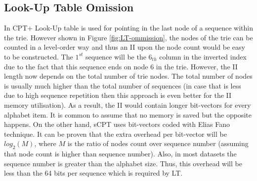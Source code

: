 \subsection{Look-Up Table Omission}
In CPT+ Look-Up table is used for pointing in the last node of a sequence within the trie. However shown in Figure \ref{fig:LT-ommission}, the nodes of the trie can be counted in a level-order way and thus an II upon the node count would be easy to be constructed. The $1^{st}$ sequence will be the $6_{th}$ column in the inverted index due to the fact that this sequence ends on node 6 in the trie. However, the II length now depends on the total number of trie nodes. The total number of nodes is usually much higher than the total number of sequences (in case that is less due to high sequence repetition then this approach is even better for the II memory utilisation). As a result, the II would contain longer bit-vectors for every alphabet item. It is common to assume that no memory is saved but the opposite happens. On the other hand, sCPT uses bit-vectors coded with Elias Fano technique. It can be proven that the extra overhead per bit-vector will be $log_2(M)$, where $M$ is the ratio of nodes count over sequence number (assuming that node count is higher than sequence number). Also, in most datasets the sequence number is greater than the alphabet size. Thus, this overhead will be less than the 64 bits per sequence which is required by LT. 

